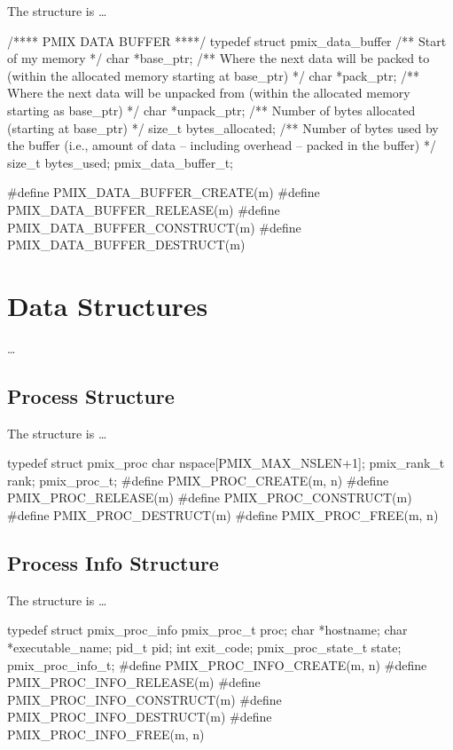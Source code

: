 The  structure is \ldots

\cspecificstart
\begin{codepar}
/****    PMIX DATA BUFFER    ****/
typedef struct pmix_data_buffer {
    /** Start of my memory */
    char *base_ptr;
    /** Where the next data will be packed to (within the allocated
        memory starting at base_ptr) */
    char *pack_ptr;
    /** Where the next data will be unpacked from (within the
        allocated memory starting as base_ptr) */
    char *unpack_ptr;
    /** Number of bytes allocated (starting at base_ptr) */
    size_t bytes_allocated;
    /** Number of bytes used by the buffer (i.e., amount of data --
        including overhead -- packed in the buffer) */
    size_t bytes_used;
} pmix_data_buffer_t;

#define PMIX_DATA_BUFFER_CREATE(m)
#define PMIX_DATA_BUFFER_RELEASE(m)
#define PMIX_DATA_BUFFER_CONSTRUCT(m)
#define PMIX_DATA_BUFFER_DESTRUCT(m)
\end{codepar}
\cspecificend


\section{Data Structures}

\ldots


\subsection{Process Structure}

The  structure is \ldots

\cspecificstart
\begin{codepar}
typedef struct pmix_proc {
    char nspace[PMIX_MAX_NSLEN+1];
    pmix_rank_t rank;
} pmix_proc_t;
#define PMIX_PROC_CREATE(m, n)
#define PMIX_PROC_RELEASE(m)
#define PMIX_PROC_CONSTRUCT(m)
#define PMIX_PROC_DESTRUCT(m)
#define PMIX_PROC_FREE(m, n)
\end{codepar}
\cspecificend


\subsection{Process Info Structure}

The  structure is \ldots

\cspecificstart
\begin{codepar}
typedef struct pmix_proc_info {
    pmix_proc_t proc;
    char *hostname;
    char *executable_name;
    pid_t pid;
    int exit_code;
    pmix_proc_state_t state;
} pmix_proc_info_t;
#define PMIX_PROC_INFO_CREATE(m, n)
#define PMIX_PROC_INFO_RELEASE(m)
#define PMIX_PROC_INFO_CONSTRUCT(m)
#define PMIX_PROC_INFO_DESTRUCT(m)
#define PMIX_PROC_INFO_FREE(m, n)
\end{codepar}
\cspecificend


